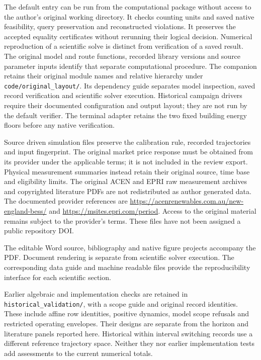 The default entry can be run from the computational package without access
to the author's original working directory. It checks counting units and
saved native feasibility, query preservation and reconstructed violations.
It preserves the accepted equality certificates without rerunning their
logical decision. Numerical reproduction of a scientific solve is distinct
from verification of a saved result. The original model and route functions,
recorded library versions and source parameter inputs identify that separate
computational procedure. The companion retains their original module names
and relative hierarchy under \texttt{code/original\_layout/}. Its dependency
guide separates model inspection, saved record verification and scientific
solver execution. Historical campaign drivers require their documented
configuration and output layout; they are not run by the default verifier. The terminal adapter retains the two fixed building
energy floors before any native verification.

Source driven simulation files preserve the calibration rule, recorded
trajectories and input fingerprint. The original market price response must
be obtained from its provider under the applicable terms; it is not included
in the review export. Physical measurement summaries instead retain
their original source, time base and eligibility limits. The original ACEN
and EPRI raw measurement archives and copyrighted literature PDFs are not
redistributed as author generated data. The documented provider references
are \url{https://acenrenewables.com.au/new-england-bess/} and
\url{https://msites.epri.com/period}. Access to the original material remains
subject to the provider's terms. These files have not been assigned a public
repository DOI.

The editable Word source, bibliography and native figure projects accompany the PDF. Document rendering is separate from scientific solver execution.
The corresponding data guide and machine readable files provide the
reproducibility interface for each scientific section.


Earlier algebraic and implementation checks are retained in
\texttt{historical\_validation/}, with a scope guide and original record
identities. These include affine row identities, positive dynamics, model
scope refusals and restricted operating envelopes. Their designs are
separate from the horizon and literature panels reported here. Historical
within interval switching records use a different reference trajectory
space. Neither they nor earlier implementation tests add assessments to
the current numerical totals.

